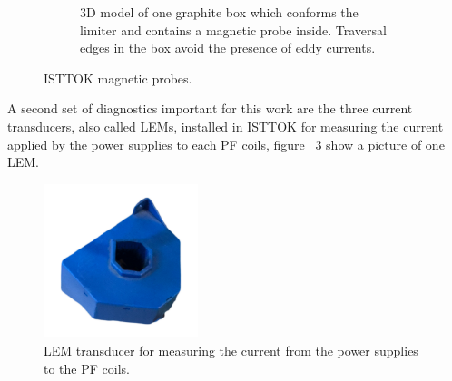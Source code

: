 \begin{figure}
\begin{subfigure}[b]{0.37\textwidth}
		\caption{\label{limiterBox} 3D model of one graphite box which conforms the limiter and contains a magnetic probe inside. Traversal edges in the box avoid the presence of eddy currents.   }
	\end{subfigure}
	\caption{ ISTTOK magnetic probes.\label{all_mirnv} }
\end{figure}



A second set of diagnostics important for this work are the three current transducers, also called LEMs, installed in ISTTOK for measuring the current applied by the power supplies  to each  PF coils, figure ~\ref{LEM} show a picture of one LEM.

\smallskip


\begin{figure}[htbp]
	\centering
	\includegraphics[width=0.4\textwidth]{Chp4/LEM.png}
	\caption{\label{LEM} LEM transducer for measuring the current from the power supplies to the PF coils.  }
\end{figure}

